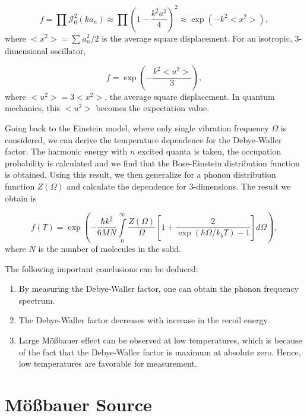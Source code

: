 \documentclass[a4paper]{report}
\numberwithin{equation}{section}
\begin{document}
\begin{equation} \label{eqn:product}
		f = \prod \mathcal{J}_{0}^2(ka_{n}) \approx \prod \left( 1 - \frac{k^2 a^2}{4}\right)^2 \approx \exp \left(- k^2 < x^2 > \right),   
\end{equation}
where $< x^2 > = \sum_{}^{} a_{n}^2 / 2$ is the average square displacement. For an isotropic, 3-dimensional oscillator, 

\begin{equation}
		f = \exp \left( - \frac{k^2 < u^2 >}{3} \right),
\end{equation}
where $< u^2 > = 3 < x^2 >$, the average square displacement. In quantum mechanics, this $< u^2 >$ becomes the expectation value.

Going back to the Einstein model, where only single vibration frequency $\Omega $ is considered, we can derive the temperature dependence for the Debye-Waller factor. The harmonic energy with $n$ excited quanta is taken, the occupation probability is calculated and we find that the Bose-Einstein distribution function is obtained. Using this result, we then generalize for a phonon distribution function $Z(\Omega )$ and calculate the dependence for 3-dimensions. The result we obtain is

\begin{equation}
		f(T) = \exp \left( - \frac{\hbar k^2}{6 M N } \int\limits_{0}^{\infty} \frac{Z(\Omega )}{\Omega } \left[ 1 + \frac{2}{\exp(\hbar \Omega / k_{b} T) - 1 } \right] d \Omega \right),
\end{equation}
where $N$ is the number of molecules in the solid. 

The following important conclusions can be deduced: 
\begin{enumerate}
		\item By measuring the Debye-Waller factor, one can obtain the phonon frequency spectrum.
		\item The Debye-Waller factor decreases with increase in the recoil energy.
		\item Large M\"o{\ss}bauer effect can be observed at low temperatures, which is because of the fact that the Debye-Waller factor is maximum at absolute zero. Hence, low temperatures are favorable for measurement.
\end{enumerate}

\section{M\"o{\ss}bauer Source}
\end{document}
